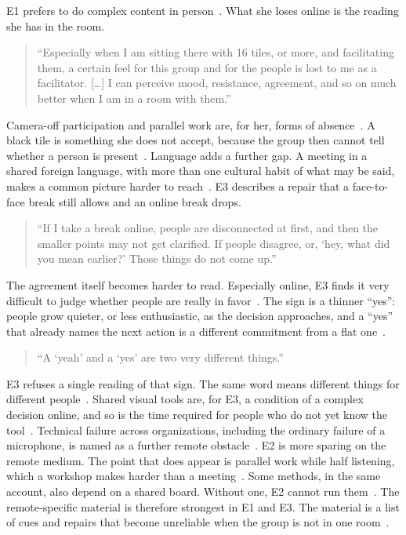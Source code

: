 E1 prefers to do complex content in person~.
What she loses online is the reading she has in the room.
{\setlength{\topsep}{0.25\baselineskip}\setlength{\partopsep}{0pt}%
  \begin{quote}\small
    \enquote{Especially when I am sitting there with 16 tiles, or more, and facilitating them,
      a certain feel for this group and for the people is lost to me as a facilitator. [\ldots]
      I can perceive mood, resistance, agreement, and so on much better when I am in a room with
    them.}~
\end{quote}}
Camera-off participation and parallel work are, for her, forms of
absence~.
A black tile is something she does not accept, because the group then cannot tell whether
a person is present~.
Language adds a further gap.
A meeting in a shared foreign language, with more than one cultural habit of what may be
said, makes a common picture harder to reach~.
E3 describes a repair that a face-to-face break still allows and an online break drops.
{\setlength{\topsep}{0.25\baselineskip}\setlength{\partopsep}{0pt}%
  \begin{quote}\small
    \enquote{If I take a break online, people are disconnected at first, and then the smaller
      points may not get clarified. If people disagree, or, \enquote{hey, what did you mean
    earlier?} Those things do not come up.}~
\end{quote}}
The agreement itself becomes harder to read.
Especially online, E3 finds it very difficult to judge whether people are really in
favor~.
The sign is a thinner ``yes'': people grow quieter, or less enthusiastic, as the decision
approaches, and a ``yes'' that already names the next action is a different commitment from
a flat one~.
{\setlength{\topsep}{0.25\baselineskip}\setlength{\partopsep}{0pt}%
  \begin{quote}\small
    \enquote{A \enquote{yeah} and a \enquote{yes} are two very different things.}~
\end{quote}}
E3 refuses a single reading of that sign.
The same word means different things for different people~.
Shared visual tools are, for E3, a condition of a complex decision online, and so is the
time required for people who do not yet know the tool~.
Technical failure across organizations, including the ordinary failure of a microphone, is
named as a further remote obstacle~.
E2 is more sparing on the remote medium.
The point that does appear is parallel work while half listening, which a workshop makes
harder than a meeting~.
Some methods, in the same account, also depend on a shared board.
Without one, E2 cannot run them~.
The remote-specific material is therefore strongest in E1 and E3.
The material is a list of cues and repairs that become unreliable when the group is not in
one room~.


